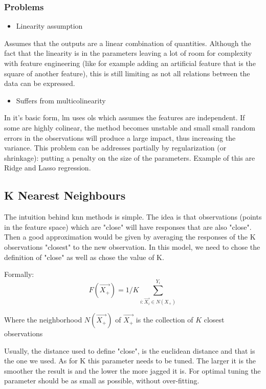 \subsubsection{Problems}
\begin{itemize}
\item Linearity assumption
\end{itemize}
Assumes that the outputs are a linear combination of quantities. Although the fact that the linearity is in the parameters leaving a lot of room for complexity with feature engineering (like for example adding an artificial feature that is the square of another feature), this is still limiting as not all relations between the data can be expressed.
\begin{itemize}
\item Suffers from multicolinearity 
\end{itemize}
In it's basic form, \acrlong{lm} uses \acrfull{ols} which assumes the features are independent. If some are highly colinear, the method becomes unstable and small small random errors in the observations will produce a large impact, thus increasing the variance. This problem can be addresses partially by regularization (or shrinkage): putting a penalty on the size of the parameters. Example of this are Ridge and Lasso regression.

\subsection{K Nearest Neighbours}
The intuition behind \acrshort{knn} methods is simple. The idea is that observations (points in the feature space) which are "close" will have responses that are also "close". Then a good approximation would be given by averaging the responses of the K observations "closest" to the new observation.
In this model, we need to chose the definition of "close" as well as chose the value of K.

Formally:
 $$
 F(\vec{X_+}) = 1/K \sum_{i:\vec{X_i} \in N(X_+)}^{Y_i}
 $$

Where the neighborhood $N(\vec{X_+})$ of $ \vec{X_+} $ is the collection of $K$ closest observations

Usually, the distance used to define "close", is the euclidean distance and that is the one we used. As for K this parameter needs to be tuned. The larger it is the smoother the result is and the lower the more jagged it is. For optimal tuning the parameter should be as small as possible, without over-fitting.
